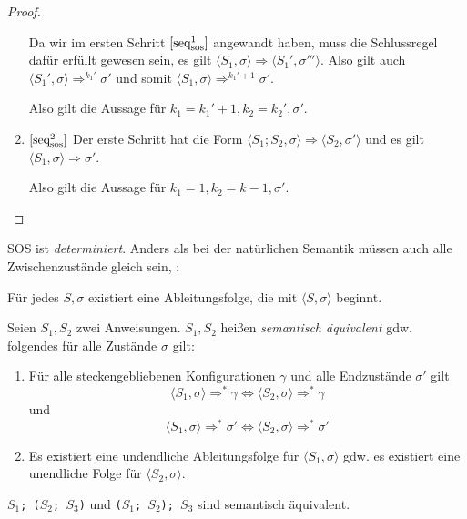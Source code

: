 \begin{proof}
\begin{enumerate}
            Da wir im ersten Schritt $\infruleSos[1]{seq}$ angewandt haben, muss die Schlussregel dafür erfüllt gewesen sein, \dh{} es gilt $\langle S_1, \sigma \rangle \Rightarrow \langle S_1', \sigma''' \rangle$. Also gilt auch $\langle S_1', \sigma \rangle \Rightarrow^{k_1'} \sigma'$ und somit $\langle S_1, \sigma \rangle \Rightarrow^{k_1'+1} \sigma'$.

            Also gilt die Aussage für $k_1 = k_1' + 1, k_2 = k_2', \sigma'$.
        \item $\infruleSos[2]{seq}$ Der erste Schritt hat die Form $\langle S_1; S_2, \sigma \rangle \Rightarrow \langle S_2, \sigma' \rangle$ und es gilt $\langle S_1, \sigma \rangle \Rightarrow \sigma'$.

            Also gilt die Aussage für $k_1 = 1, k_2 = k - 1, \sigma'$.
    \end{enumerate}
\end{proof}


\begin{lemma}[Determiniertheit]
    SOS ist \emph{determiniert}. Anders als bei der natürlichen Semantik müssen auch alle Zwischenzustände gleich sein, \dh{}:

        Für jedes $S, \sigma$ existiert eine Ableitungsfolge, die mit $\langle S, \sigma \rangle$ beginnt.
\end{lemma}


\begin{definition}
    Seien $S_1, S_2$ zwei Anweisungen. $S_1, S_2$ heißen \emph{semantisch äquivalent} gdw. folgendes für alle Zustände $\sigma$ gilt:

    \begin{enumerate}
        \item Für alle steckengebliebenen Konfigurationen $\gamma$ und alle Endzustände $\sigma'$ gilt
            \[
                \langle S_1, \sigma \rangle \Rightarrow^* \gamma \Leftrightarrow \langle S_2, \sigma \rangle \Rightarrow^* \gamma
            \]
            und
            \[
                \langle S_1, \sigma \rangle \Rightarrow^* \sigma' \Leftrightarrow \langle S_2, \sigma \rangle \Rightarrow^* \sigma'
            \]
        \item Es existiert eine undendliche Ableitungsfolge für $\langle S_1, \sigma \rangle$ gdw. es existiert eine unendliche Folge für $\langle S_2, \sigma \rangle$.
    \end{enumerate}
\end{definition}

\par\medskip
\begin{example}
    \texttt{$S_1$; ($S_2$; $S_3$)} und \texttt{($S_1$; $S_2$); $S_3$} sind semantisch äquivalent.
\end{example}



